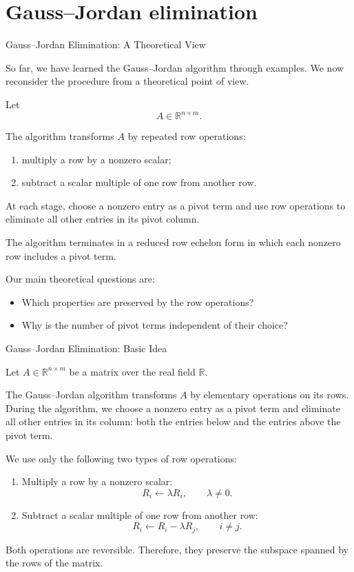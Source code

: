 \section{Gauss--Jordan elimination}
\begin{frame}{Gauss--Jordan Elimination: A Theoretical View}

So far, we have learned the Gauss--Jordan algorithm through examples.
We now reconsider the procedure from a theoretical point of view.

Let
\[
A\in\mathbb{R}^{n\times m}.
\]

The algorithm transforms \(A\) by repeated row operations:
\begin{enumerate}
\item multiply a row by a nonzero scalar;
\item subtract a scalar multiple of one row from another row.
\end{enumerate}

At each stage, choose a nonzero entry as a \alert{pivot term} and use
row operations to eliminate all other entries in its pivot column.

The algorithm terminates in a reduced row echelon form in which each 
nonzero row includes a pivot term.
\end{frame}
\begin{frame}

Our main theoretical questions are:

\begin{itemize}
    \item 
     Which properties are preserved by the row operations?
    \item
     Why is the number of pivot terms independent of their choice?
\end{itemize}
\end{frame}
\begin{frame}{Gauss--Jordan Elimination: Basic Idea}

Let
\(
A\in\mathbb{R}^{n\times m}
\)
be a matrix over the real field \(\mathbb{R}\).

The Gauss--Jordan algorithm transforms \(A\) by elementary operations
on its rows. During the algorithm, we choose a nonzero entry as a
\alert{pivot term} and eliminate all other entries in its column:
both the entries below and the entries above the pivot term.

We use only the following two types of row operations:
\begin{enumerate}
\item Multiply a row by a nonzero scalar:
\[
R_i \longleftarrow \lambda R_i,
\qquad \lambda\neq 0.
\]

\item Subtract a scalar multiple of one row from another row:
\[
R_i \longleftarrow R_i-\lambda R_j,
\qquad i\neq j.
\]
\end{enumerate}

Both operations are reversible. Therefore, they preserve the subspace
spanned by the rows of the matrix.
\end{frame}
